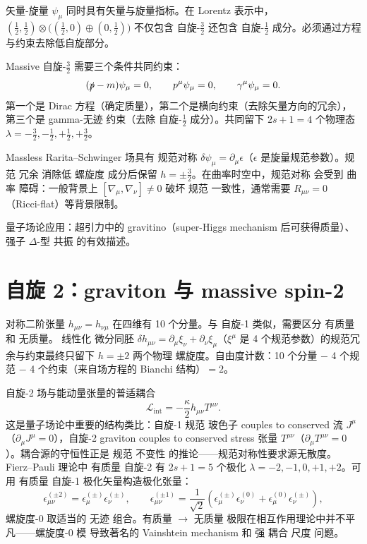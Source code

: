 矢量-旋量 $\psi_\mu$ 同时具有矢量与旋量指标。在 Lorentz 表示中，$(\frac{1}{2},\frac{1}{2})\otimes\big((\frac{1}{2},0)\oplus(0,\frac{1}{2})\big)$ 不仅包含 自旋-$\frac{3}{2}$ 还包含 自旋-$\frac{1}{2}$ 成分。必须通过方程与约束去除低自旋部分。

Massive 自旋-$\frac{3}{2}$ 需要三个条件共同约束：
\begin{equation}
(\slashed p-m)\psi_\mu=0,\qquad p^\mu\psi_\mu=0,\qquad \gamma^\mu\psi_\mu=0.
\end{equation}
第一个是 Dirac 方程（确定质量），第二个是横向约束（去除矢量方向的冗余），第三个是 gamma-无迹 约束（去除 自旋-$\frac{1}{2}$ 成分）。共同留下 $2s+1=4$ 个物理态 $\lambda=-\frac{3}{2},-\frac{1}{2},+\frac{1}{2},+\frac{3}{2}$。

Massless Rarita--Schwinger 场具有 规范对称 $\delta\psi_\mu=\partial_\mu\epsilon$（$\epsilon$ 是旋量规范参数）。规范 冗余 消除低 螺旋度 成分后保留 $h=\pm\frac{3}{2}$。在曲率时空中，规范对称 会受到 曲率 障碍：一般背景上 $[\nabla_\mu,\nabla_\nu]\neq0$ 破坏 规范 一致性，通常需要 $R_{\mu\nu}=0$（Ricci-flat）等背景限制。

量子场论应用：超引力中的 gravitino（super-Higgs mechanism 后可获得质量）、强子 $\Delta$-型 共振 的有效描述。

\section{自旋 2：graviton 与 massive spin-2}

对称二阶张量 $h_{\mu\nu}=h_{\nu\mu}$ 在四维有 10 个分量。与 自旋-1 类似，需要区分 有质量 和 无质量。
线性化 微分同胚 $\delta h_{\mu\nu}=\partial_\mu\xi_\nu+\partial_\nu\xi_\mu$（$\xi^\mu$ 是 4 个规范参数）的规范冗余与约束最终只留下 $h=\pm2$ 两个物理 螺旋度。自由度计数：10 个分量 $-$ 4 个规范 $-$ 4 个约束（来自场方程的 Bianchi 结构）$=2$。

自旋-2 场与能动量张量的普适耦合
\begin{equation*}\boxed{\mathcal{L}_{\text{int}}=-\frac{\kappa}{2}h_{\mu\nu}T^{\mu\nu}.}
\end{equation*}
这是量子场论中重要的结构类比：自旋-1 规范 玻色子 couples to conserved 流 $J^\mu$（$\partial_\mu J^\mu=0$），自旋-2 graviton couples to conserved stress 张量 $T^{\mu\nu}$（$\partial_\mu T^{\mu\nu}=0$）。耦合源的守恒性正是 规范 不变性 的推论——规范对称性要求源无散度。
Fierz--Pauli 理论中 有质量 自旋-2 有 $2s+1=5$ 个极化 $\lambda=-2,-1,0,+1,+2$。可用 有质量 自旋-1 极化矢量构造极化张量：
\begin{equation}
\epsilon_{\mu\nu}^{(\pm 2)}=\epsilon_\mu^{(\pm)}\epsilon_\nu^{(\pm)},\qquad
\epsilon_{\mu\nu}^{(\pm 1)}=\frac{1}{\sqrt{2}}(\epsilon_\mu^{(\pm)}\epsilon_\nu^{(0)}+\epsilon_\mu^{(0)}\epsilon_\nu^{(\pm)}),
\end{equation}
螺旋度-0 取适当的 无迹 组合。有质量 $\to$ 无质量 极限在相互作用理论中并不平凡——螺旋度-0 模 导致著名的 Vainshtein mechanism 和 强 耦合 尺度 问题。

